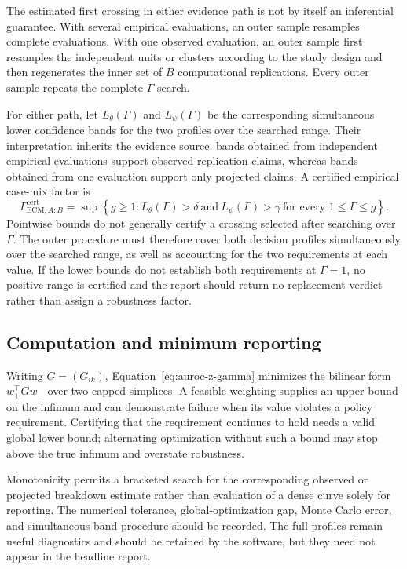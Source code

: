 \documentclass[11pt]{article}
\theoremstyle{remark}
\begin{document}
The estimated first crossing in either evidence path is not by itself an
inferential guarantee. With several empirical evaluations, an outer sample
resamples complete evaluations. With one observed evaluation, an outer sample
first resamples the independent units or clusters according to the study design
and then regenerates the inner set of $B$ computational replications. Every
outer sample repeats the complete $\Gamma$ search.

For either path, let $L_\theta(\Gamma)$ and $L_\psi(\Gamma)$ be the corresponding
simultaneous lower confidence bands for the two profiles over the searched
range. Their interpretation inherits the evidence source: bands obtained from
independent empirical evaluations support observed-replication claims, whereas
bands obtained from one evaluation support only projected claims. A certified
empirical case-mix factor is
\begin{equation}
\Gamma_{\mathrm{ECM},A:B}^{\mathrm{cert}}
=
\sup\left\{
g\geq1:
L_\theta(\Gamma)>\delta
\ \text{and}\ 
L_\psi(\Gamma)>\gamma
\ \text{for every }1\leq\Gamma\leq g
\right\}.
\label{eq:auroc-ecm-certified}
\end{equation}
Pointwise bounds do not generally certify a crossing selected after searching
over $\Gamma$. The outer procedure must therefore cover both decision profiles
simultaneously over the searched range, as well as accounting for the two
requirements at each value. If the lower bounds do not establish both
requirements at $\Gamma=1$, no positive range is certified and the report
should return no replacement verdict rather than assign a robustness factor.



\subsection{Computation and minimum reporting}

Writing $G=(G_{ik})$, Equation~\eqref{eq:auroc-z-gamma} minimizes the bilinear
form $w_+^\top G w_-$ over two capped simplices. A feasible weighting supplies
an upper bound on the infimum and can demonstrate failure when its value
violates a policy requirement. Certifying that the requirement continues to
hold needs a valid global lower bound; alternating optimization without such a
bound may stop above the true infimum and overstate robustness.

Monotonicity permits a bracketed search for the corresponding observed or
projected breakdown estimate rather than evaluation of a dense curve solely for
reporting. The numerical tolerance, global-optimization gap, Monte Carlo error,
and simultaneous-band procedure should be recorded. The full profiles remain
useful diagnostics and should be retained by the software, but they need not
appear in the headline report.
\end{document}
